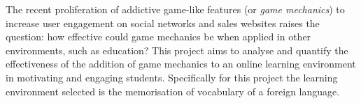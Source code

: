 The recent proliferation of addictive game-like features (or \textit{game mechanics}) to increase user engagement on social networks and sales websites raises the question: how effective could game mechanics be when applied in other environments, such as education? This project aims to analyse and quantify the effectiveness of the addition of game mechanics to an online learning environment in motivating and engaging students. Specifically for this project the learning environment selected is the memorisation of vocabulary of a foreign language.
